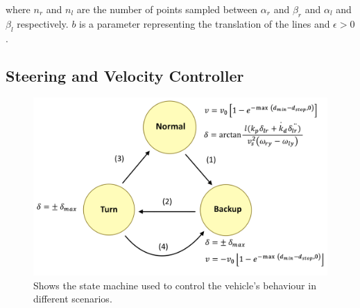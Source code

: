 \documentclass[conference]{IEEEtran}
\begin{document}
where $n_r$ and $n_l$ are the number of points sampled between $\alpha_r$ and $\beta_r$ and $\alpha_l$ and $\beta_l$ respectively. $b$ is a parameter representing the translation of the lines and $\epsilon > 0$.






\subsection{Steering and Velocity Controller}

\begin{figure}
    \centering
    \includegraphics[scale=0.10]{state_machine.png}
    \caption{Shows the state machine used to control the vehicle's behaviour in different scenarios.}
\end{figure}
\end{document}
